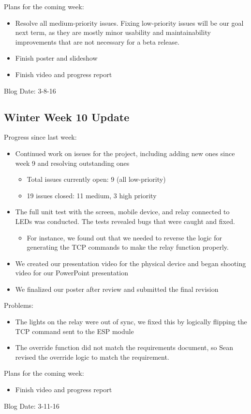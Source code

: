 Plans for the coming week:
\begin{itemize}
   \item Resolve all medium-priority issues.  Fixing low-priority issues will be our goal next term, as they are mostly minor usability and maintainability improvements that are not necessary for a beta release.
   \item Finish poster and slideshow
   \item Finish video and progress report
\end{itemize}
Blog Date: 3-8-16

\subsection{Winter Week 10 Update}
Progress since last week:
\begin{itemize}
   \item Continued work on issues for the project, including adding new ones since week 9 and resolving outstanding ones
      \begin{itemize}
         \item Total issues currently open: 9 (all low-priority)
         \item 19 issues closed: 11 medium, 3 high priority
      \end{itemize}
   \item The full unit test with the screen, mobile device, and relay connected to LEDs was conducted. The tests revealed bugs that were caught and fixed.
      \begin{itemize}
         \item For instance, we found out that we needed to reverse the logic for generating the TCP commands to make the relay function properly.
      \end{itemize}
   \item We created our presentation video for the physical device and began shooting video for our PowerPoint presentation
   \item We finalized our poster after review and submitted the final revision
\end{itemize}
Problems:
\begin{itemize}
   \item The lights on the relay were out of sync, we fixed this by logically flipping the TCP command sent to the ESP module
   \item The override function did not match the requirements document, so Sean revised the override logic to match the requirement.
\end{itemize}
Plans for the coming week:
\begin{itemize}
   \item Finish video and progress report
\end{itemize}
Blog Date: 3-11-16

